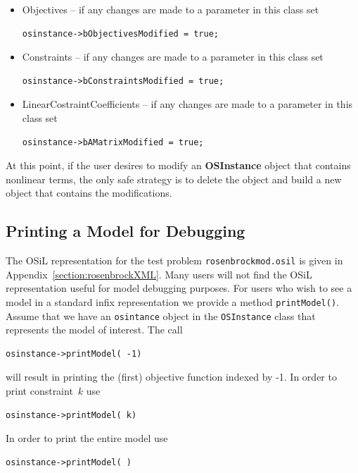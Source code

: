 \documentclass[11pt]{article}
\renewcommand{\_}{{\char"5F}}
\renewcommand{\{}{{\char"7B}}
\renewcommand{\}}{{\char"7D}}
\renewcommand{\^}{{\char"0D}}
\renewcommand{\'}{{\char"0D}}
\begin{document}
\begin{enumerate}[Step 1:]
\begin{itemize}
\item Objectives -- if any changes are made to a parameter in this class set

\begin{verbatim}
osinstance->bObjectivesModified = true;
\end{verbatim}

\item Constraints -- if any changes are made to a parameter in this class set

\begin{verbatim}
osinstance->bConstraintsModified = true;
\end{verbatim}

\item LinearCostraintCoefficients -- if any changes are made to a parameter in this class set

\begin{verbatim}
osinstance->bAMatrixModified = true;
\end{verbatim}
\end{itemize}

At this point, if the user desires to modify an {\bf OSInstance} object that contains nonlinear terms, 
the only safe strategy is to delete the object and build a new object that contains the modifications. 



\subsection{Printing a Model for Debugging}\label{section:printModel}

The OSiL representation for the test problem {\tt rosenbrockmod.osil} is given in 
Appendix~\ref{section:rosenbrockXML}.  Many users will not find the OSiL representation 
useful for model debugging purposes.  For users who wish to see a model in a standard infix 
representation we provide a method {\tt printModel()}.  Assume that we have an {\tt osintance} 
object in the {\tt OSInstance} class that represents the model of interest.  The call
\begin{verbatim}
osinstance->printModel( -1)
\end{verbatim}
will result in printing the (first) objective function indexed by -1.  In order to print 
constraint~$k$ use
\begin{verbatim}
osinstance->printModel( k)
\end{verbatim}
In order to print the entire model use
\begin{verbatim}
osinstance->printModel( )
\end{verbatim}


\end{enumerate}
\end{document}

